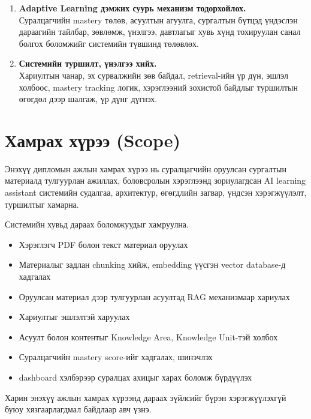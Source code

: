 \documentclass[12pt,A4]{report}
\newcommand{\eng}[1]{#1}
\begin{document}
\begin{enumerate}
    \item \textbf{\eng{Adaptive Learning} дэмжих суурь механизм тодорхойлох.} \\
    Суралцагчийн \eng{mastery} төлөв, асуултын агуулга, сургалтын бүтцэд үндэслэн дараагийн тайлбар, зөвлөмж, үнэлгээ, давтлагыг хувь хүнд тохируулан санал болгох боломжийг системийн түвшинд төлөвлөх.

    \item \textbf{Системийн туршилт, үнэлгээ хийх.} \\
    Хариултын чанар, эх сурвалжийн зөв байдал, retrieval-ийн үр дүн, эшлэл холбоос, \eng{mastery tracking} логик, хэрэглээний зохистой байдлыг туршилтын өгөгдөл дээр шалгаж, үр дүнг дүгнэх.
\end{enumerate}

\section*{Хамрах хүрээ (Scope)}

Энэхүү дипломын ажлын хамрах хүрээ нь суралцагчийн оруулсан сургалтын материалд тулгуурлан ажиллах, боловсролын хэрэглээнд зориулагдсан \eng{AI learning assistant} системийн судалгаа, архитектур, өгөгдлийн загвар, үндсэн хэрэгжүүлэлт, туршилтыг хамарна.

Системийн хувьд дараах боломжуудыг хамруулна.

\begin{itemize}
    \item Хэрэглэгч \eng{PDF} болон текст материал оруулах
    \item Материалыг задлан \eng{chunking} хийж, \eng{embedding} үүсгэн \eng{vector database}-д хадгалах
    \item Оруулсан материал дээр тулгуурлан асуултад \eng{RAG} механизмаар хариулах
    \item Хариултыг эшлэлтэй харуулах
    \item Асуулт болон контентыг \eng{Knowledge Area}, \eng{Knowledge Unit}-тэй холбох
    \item Суралцагчийн \eng{mastery score}-ийг хадгалах, шинэчлэх
    \item \eng{dashboard} хэлбэрээр суралцах ахицыг харах боломж бүрдүүлэх
\end{itemize}

Харин энэхүү ажлын хамрах хүрээнд дараах зүйлсийг бүрэн хэрэгжүүлэхгүй буюу хязгаарлагдмал байдлаар авч үзнэ.
\end{document}
